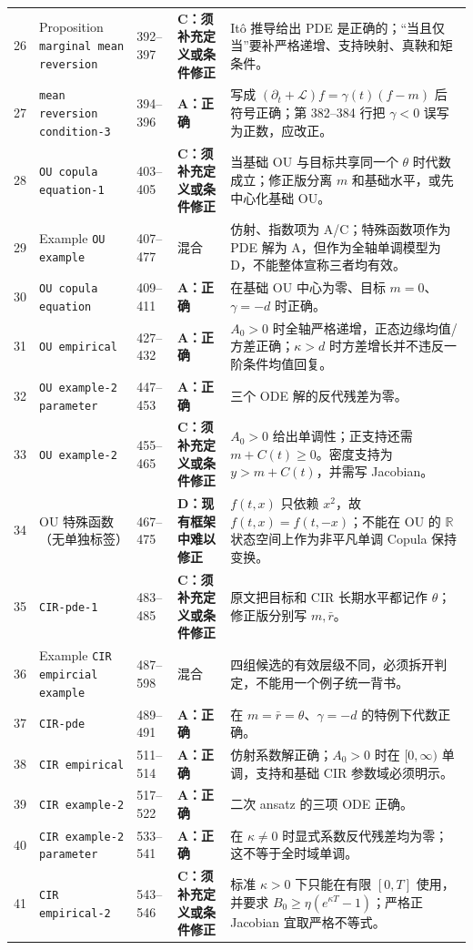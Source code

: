 \documentclass[UTF8,11pt]{ctexart}
\newcommand{\R}{\mathbb R}
\newcommand{\Acat}{\textcolor{green!45!black}{\textbf{A：正确}}}
\newcommand{\Ccat}{\textcolor{orange!80!black}{\textbf{C：须补充定义或条件修正}}}
\newcommand{\Dcat}{\textcolor{red!70!black}{\textbf{D：现有框架中难以修正}}}
\begin{document}
\begin{longtable}{p{}p{}p{}p{}p{}}
26 & Proposition \texttt{marginal mean reversion} & 392--397 & \Ccat & It\^o 推导给出 PDE 是正确的；“当且仅当”要补严格递增、支持映射、真鞅和矩条件。\\
27 & \texttt{mean reversion \allowbreak condition-3} & 394--396 & \Acat & 写成 $(\partial_t+\mathcal L)f=\gamma(t)(f-m)$ 后符号正确；第 382--384 行把 $\gamma<0$ 误写为正数，应改正。\\
28 & \texttt{OU copula equation-1} & 403--405 & \Ccat & 当基础 OU 与目标共享同一个 $\theta$ 时代数成立；修正版分离 $m$ 和基础水平，或先中心化基础 OU。\\
29 & Example \texttt{OU example} & 407--477 & 混合 & 仿射、指数项为 A/C；特殊函数项作为 PDE 解为 A，但作为全轴单调模型为 D，不能整体宣称三者均有效。\\
30 & \texttt{OU copula equation} & 409--411 & \Acat & 在基础 OU 中心为零、目标 $m=0$、$\gamma=-d$ 时正确。\\
31 & \texttt{OU empirical} & 427--432 & \Acat & $A_0>0$ 时全轴严格递增，正态边缘均值/方差正确；$\kappa>d$ 时方差增长并不违反一阶条件均值回复。\\
32 & \texttt{OU example-2 parameter} & 447--453 & \Acat & 三个 ODE 解的反代残差为零。\\
33 & \texttt{OU example-2} & 455--465 & \Ccat & $A_0>0$ 给出单调性；正支持还需 $m+C(t)\ge0$。密度支持为 $y>m+C(t)$，并需写 Jacobian。\\
34 & OU 特殊函数（无单独标签） & 467--475 & \Dcat & $f(t,x)$ 只依赖 $x^2$，故 $f(t,x)=f(t,-x)$；不能在 OU 的 $\R$ 状态空间上作为非平凡单调 Copula 保持变换。\\
35 & \texttt{CIR-pde-1} & 483--485 & \Ccat & 原文把目标和 CIR 长期水平都记作 $\theta$；修正版分别写 $m,\bar r$。\\
36 & Example \texttt{CIR empircial example} & 487--598 & 混合 & 四组候选的有效层级不同，必须拆开判定，不能用一个例子统一背书。\\
37 & \texttt{CIR-pde} & 489--491 & \Acat & 在 $m=\bar r=\theta$、$\gamma=-d$ 的特例下代数正确。\\
38 & \texttt{CIR empirical} & 511--514 & \Acat & 仿射系数解正确；$A_0>0$ 时在 $[0,\infty)$ 单调，支持和基础 CIR 参数域必须明示。\\
39 & \texttt{CIR example-2} & 517--522 & \Acat & 二次 ansatz 的三项 ODE 正确。\\
40 & \texttt{CIR example-2 parameter} & 533--541 & \Acat & 在 $\kappa\ne0$ 时显式系数反代残差均为零；这不等于全时域单调。\\
41 & \texttt{CIR empirical-2} & 543--546 & \Ccat & 标准 $\kappa>0$ 下只能在有限 $[0,T]$ 使用，并要求 $B_0\ge\eta(e^{\kappa T}-1)$；严格正 Jacobian 宜取严格不等式。\\

\end{longtable}
\end{document}
